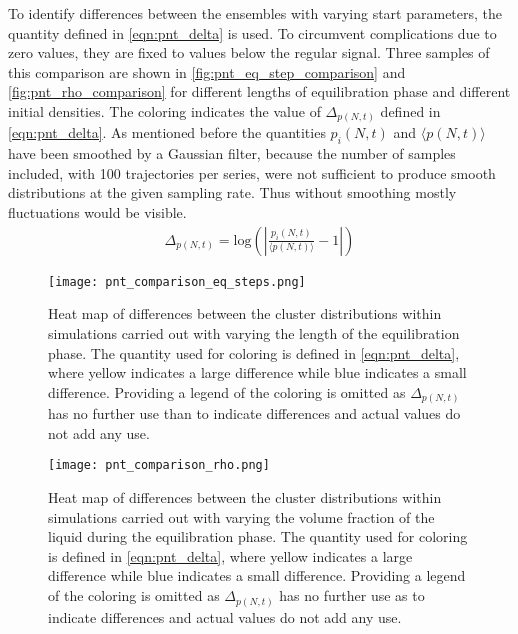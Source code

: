 To identify differences between the ensembles with varying start parameters, the quantity defined in \autoref{eqn:pnt_delta} is used. To circumvent complications due to zero values, they are fixed to values below the regular signal. Three samples of this comparison are shown in \autoref{fig:pnt_eq_step_comparison} and \autoref{fig:pnt_rho_comparison} for different lengths of equilibration phase and different initial densities. The coloring indicates the value of $\Delta_{p(N,t)}$ defined in \autoref{eqn:pnt_delta}. As mentioned before the quantities $p_i(N,t)$ and $\langle p(N,t) \rangle$ have been smoothed by a Gaussian filter, because the number of samples included, with 100 trajectories per series, were not sufficient to produce smooth distributions at the given sampling rate. Thus without smoothing mostly fluctuations would be visible.
\begin{align}
\label{eqn:pnt_delta}
\Delta_{p(N,t)} = \text{log} \left( \left| \frac{p_i(N,t)}{\langle p(N,t) \rangle} -1 \right| \right)
\end{align}
\begin{figure}[h!]
\centering
\texttt{[image: pnt\_comparison\_eq\_steps.png]}
\caption[Heat maps of differences under variation of equilibration step number]{Heat map of differences between the cluster distributions within simulations carried out with varying the length of the equilibration phase. The quantity used for coloring is defined in \autoref{eqn:pnt_delta}, where yellow indicates a large difference while blue indicates a small difference. Providing a legend of the coloring is omitted as $\Delta_{p(N,t)}$ has no further use than to indicate differences and actual values do not add any use.}
\label{fig:pnt_eq_step_comparison}
\end{figure}

\begin{figure}[h!]
\centering
\texttt{[image: pnt\_comparison\_rho.png]}
\caption[Heat maps of differences under variation of initial density]{Heat map of differences between the cluster distributions within simulations carried out with varying the volume fraction of the liquid during the equilibration phase. The quantity used for coloring is defined in \autoref{eqn:pnt_delta}, where yellow indicates a large difference while blue indicates a small difference. Providing a legend of the coloring is omitted as $\Delta_{p(N,t)}$ has no further use as to indicate differences and actual values do not add any use.}
\label{fig:pnt_rho_comparison}
\end{figure}

